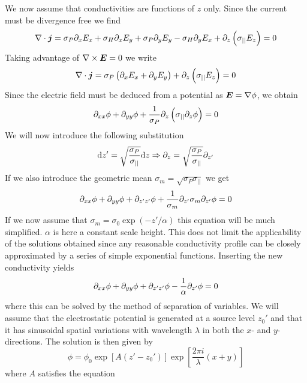 We now assume that conductivities are functions of \(z\) only. Since the current must be divergence free we find
\begin{equation*}
    \nabla\cdot\boldsymbol{j}=\sigma_P\partial_{x}E_x+\sigma_H\partial_{x}E_y+\sigma_P\partial_{y}E_y-\sigma_H\partial_{y}E_x+\partial_{z}\left(\sigma_{||}E_z\right)=0
\end{equation*}
Taking advantage of \(\nabla\times\boldsymbol{E}=0\) we write
\begin{equation*}
    \nabla\cdot\boldsymbol{j}=\sigma_P\left(\partial_{x}E_x+\partial_{y}E_y\right)+\partial_{z}\left(\sigma_{||}E_z\right)=0
\end{equation*}
Since the electric field must be deduced from a potential as \(\boldsymbol{E}=\nabla\phi \), we obtain
\begin{equation*}
    \partial_{xx}\phi+\partial_{yy}\phi+\frac{1}{\sigma_P}\partial_{z}\left(\sigma_{||}\partial_{z}\phi\right)=0
\end{equation*}
We will now introduce the following substitution
\begin{equation*}
    \textnormal{d}z'=\sqrt{\frac{\sigma_P}{\sigma_{||}}}\textnormal{d}z \Rightarrow \partial_{z}=\sqrt{\frac{\sigma_P}{\sigma_{||}}}\partial_{z'}
\end{equation*}
If we also introduce the geometric mean \(\sigma_m=\sqrt{\sigma_P\sigma_{||}}\) we get
\begin{equation*}
    \partial_{xx}\phi+\partial_{yy}\phi+\partial_{z'z'}\phi+\frac{1}{\sigma_m}\partial_{z'}\sigma_m\partial_{z'}\phi=0
\end{equation*}
If we now assume that \(\sigma_m=\sigma_0\exp(-z'/\alpha)\) this equation will be much simplified. \(\alpha \) is here a constant scale height. This does not limit the applicability of the solutions obtained since any reasonable conductivity profile can be closely approximated by a series of simple exponential functions. Inserting the new conductivity yields
\begin{equation*}
    \partial_{xx}\phi+\partial_{yy}\phi+\partial_{z'z'}\phi-\frac{1}{\alpha}\partial_{z'}\phi=0
\end{equation*}
where this can be solved by the method of separation of variables. We will assume that the electrostatic potential is generated at a source level \(z_0'\) and that it has sinusoidal spatial variations with wavelength \(\lambda \) in both the \(x\)- and \(y\)-directions. The solution is then given by
\begin{equation*}
    \phi=\phi_0\exp\left[A\left(z'-z_0'\right)\right]\exp\left[\frac{2\pi i}{\lambda}\left(x+y\right)\right]
\end{equation*}
where \(A\) satisfies the equation
